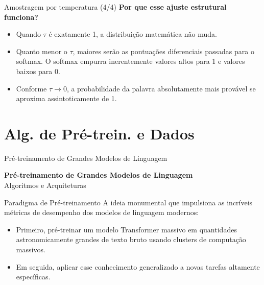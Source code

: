 \documentclass[aspectratio=169]{beamer}
\begin{document}
\begin{frame}{Amostragem por temperatura (4/4)}\justifying 
    \vspace{0.3cm}
    \textbf{Por que esse ajuste estrutural funciona?}
    \begin{itemize}
        \item Quando $\tau$ é exatamente 1, a distribuição matemática não muda.
        \item Quanto menor o $\tau$, maiores serão as pontuações diferenciais passadas para o softmax. O softmax empurra inerentemente valores altos para 1 e valores baixos para 0.
        \item Conforme $\tau \to 0$, a probabilidade da palavra absolutamente mais provável se aproxima assintoticamente de 1.
    \end{itemize}
\end{frame}

\section{Alg. de Pré-trein. e Dados}

\begin{frame}{Pré-treinamento de Grandes Modelos de Linguagem}
    \begin{center}
        \huge \textbf{Pré-treinamento de Grandes Modelos de Linguagem}\\
        \vspace{0.5cm}
        \Large Algoritmos e Arquiteturas
    \end{center}
\end{frame}

\begin{frame}{Paradigma de Pré-treinamento}\justifying
    A ideia monumental que impulsiona as incríveis métricas de desempenho dos modelos de linguagem modernos:
    \begin{itemize}
        \item Primeiro, pré-treinar um modelo Transformer massivo em quantidades astronomicamente grandes de texto bruto usando clusters de computação massivos.
        \item Em seguida, aplicar esse conhecimento generalizado a novas tarefas altamente específicas.
    \end{itemize}
\end{frame}
\end{document}
